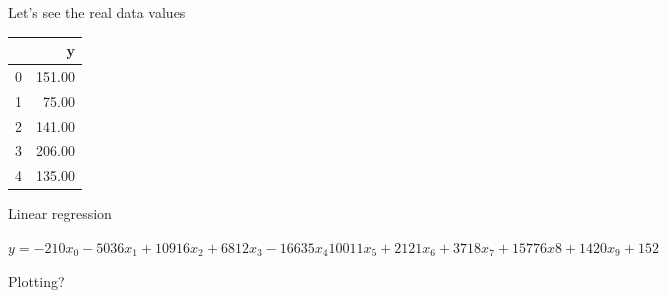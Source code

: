 \documentclass[obeyspaces,aspectratio=43]{beamer}
\begin{document}
\begin{frame}{Let's see the real data values}
\begin{tabular}{lr}
\toprule                                                                                                                                                                      
{} &  y \\                                                                                                                                                               
\midrule                                                                                                                                                                      
0 &  151.00 \\                                                                                                                                                                
1 &   75.00 \\                                                                                                                                                                
2 &  141.00 \\                                                                                                                                                                
3 &  206.00 \\                                                                                                                                                                
4 &  135.00 \\                                                                                                                                                                
\bottomrule                                                                                                                                                                   
\end{tabular}

\end{frame}

\begin{frame}{Linear regression}

\(y = -210x_0 -5036x_1 + 10916x_2 + 6812x_3  -16635x_4 10011x_5 + 2121x_6 + 3718x_7 +  15776x8 + 1420x_{9} + 152\)

\end{frame}

\begin{frame}{Plotting?}

\end{frame}
\end{document}
